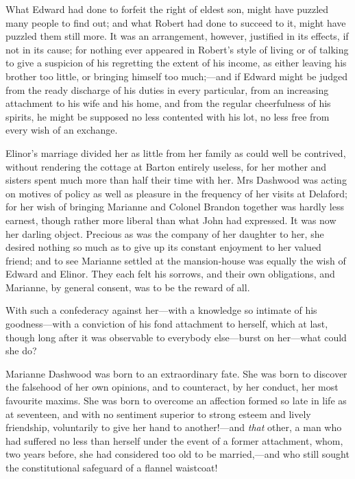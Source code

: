What Edward had done to forfeit the right of eldest son, might have puzzled many people to find out; and what Robert had done to succeed to it, might have puzzled them still more. It was an arrangement, however, justified in its effects, if not in its cause; for nothing ever appeared in Robert's style of living or of talking to give a suspicion of his regretting the extent of his income, as either leaving his brother too little, or bringing himself too much;—and if Edward might be judged from the ready discharge of his duties in every particular, from an increasing attachment to his wife and his home, and from the regular cheerfulness of his spirits, he might be supposed no less contented with his lot, no less free from every wish of an exchange.

Elinor's marriage divided her as little from her family as could well be contrived, without rendering the cottage at Barton entirely useless, for her mother and sisters spent much more than half their time with her. Mrs Dashwood was acting on motives of policy as well as pleasure in the frequency of her visits at Delaford; for her wish of bringing Marianne and Colonel Brandon together was hardly less earnest, though rather more liberal than what John had expressed. It was now her darling object. Precious as was the company of her daughter to her, she desired nothing so much as to give up its constant enjoyment to her valued friend; and to see Marianne settled at the mansion-house was equally the wish of Edward and Elinor. They each felt his sorrows, and their own obligations, and Marianne, by general consent, was to be the reward of all.

With such a confederacy against her—with a knowledge so intimate of his goodness—with a conviction of his fond attachment to herself, which at last, though long after it was observable to everybody else—burst on her—what could she do?

Marianne Dashwood was born to an extraordinary fate. She was born to discover the falsehood of her own opinions, and to counteract, by her conduct, her most favourite maxims. She was born to overcome an affection formed so late in life as at seventeen, and with no sentiment superior to strong esteem and lively friendship, voluntarily to give her hand to another!—and \textit{that} other, a man who had suffered no less than herself under the event of a former attachment, whom, two years before, she had considered too old to be married,—and who still sought the constitutional safeguard of a flannel waistcoat!

